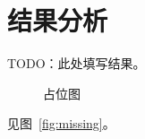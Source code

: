 \documentclass{ctexart}
\begin{document}
\section{结果分析}
TODO：此处填写结果。
\begin{figure}
占位图
\end{figure}
见图~\ref{fig:missing}。
\end{document}
